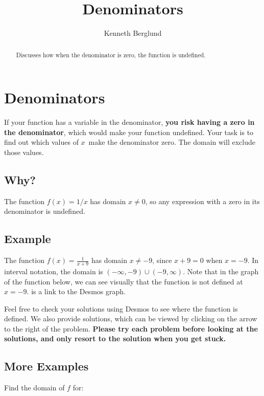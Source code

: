 \documentclass{ximera}
\title{Denominators}
\author{Kenneth Berglund}
\begin{document}
\begin{abstract}
Discusses how when the denominator is zero, the function is undefined. 
\end{abstract}
\maketitle

\section{Denominators}
If your function has a variable in the denominator, \textbf{you risk having a zero in the denominator}, which would make your function undefined. Your task is to find out which values of $x$ make the denominator zero. The domain will exclude those values.

\subsection{Why?}
The function $f(x) = 1/x$ has domain $x \ne 0$, so any expression with a zero in its denominator is undefined. 

\subsection{Example}
The function $f(x) = \frac{1}{x + 9}$ has domain $x \ne -9$, since $x + 9 = 0$ when $x = -9$. In interval notation, the domain is $(-\infty, -9) \cup (-9, \infty)$. Note that in the graph of the function below, we can see visually that the function is not defined at $x = -9$.  is a link to the Desmos graph. 

\begin{center}
\end{center}

Feel free to check your solutions using Desmos to see where the function is defined. We also provide solutions, which can be viewed by clicking on the arrow to the right of the problem. \textbf{Please try each problem before looking at the solutions, and only resort to the solution when you get stuck.} 

\subsection{More Examples}
Find the domain of $f$ for:
\end{document}
